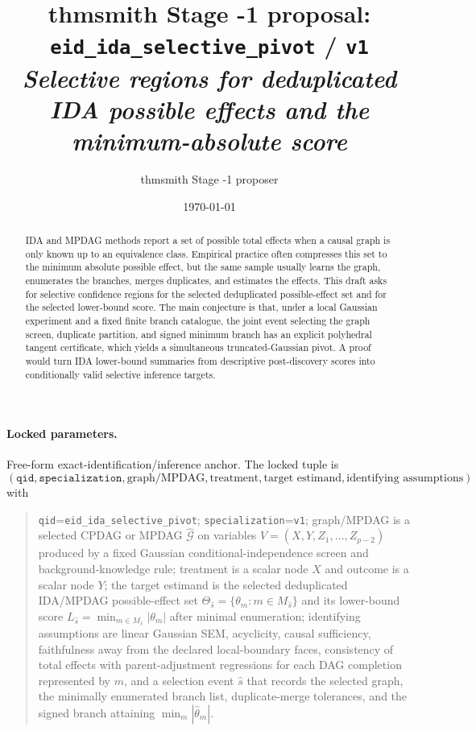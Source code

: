 \documentclass[11pt]{article}
\title{thmsmith Stage -1 proposal: \texttt{eid\_ida\_selective\_pivot} / \texttt{v1}%
  \\ \large\textit{Selective regions for deduplicated IDA possible effects and the minimum-absolute score}}
\author{thmsmith Stage -1 proposer}
\date{\today}
\theoremstyle{definition}
\theoremstyle{plain}
\theoremstyle{remark}
\begin{document}
\maketitle


\paragraph{Locked parameters.}
Free-form exact-identification/inference anchor. The locked tuple is
\[
(\texttt{qid},\texttt{specialization},\text{graph/MPDAG},\text{treatment},\text{target estimand},\text{identifying assumptions})
\]
with
\begin{quote}
\texttt{qid}=\texttt{eid\_ida\_selective\_pivot}; \texttt{specialization}=\texttt{v1}; graph/MPDAG is a selected CPDAG or MPDAG $\widehat{\mathcal G}$ on variables $V=(X,Y,Z_1,\ldots,Z_{p-2})$ produced by a fixed Gaussian conditional-independence screen and background-knowledge rule; treatment is a scalar node $X$ and outcome is a scalar node $Y$; the target estimand is the selected deduplicated IDA/MPDAG possible-effect set $\Theta_{\widehat s}=\{\theta_m:m\in M_{\widehat s}\}$ and its lower-bound score $L_{\widehat s}=\min_{m\in M_{\widehat s}}|\theta_m|$ after minimal enumeration; identifying assumptions are linear Gaussian SEM, acyclicity, causal sufficiency, faithfulness away from the declared local-boundary faces, consistency of total effects with parent-adjustment regressions for each DAG completion represented by $m$, and a selection event $\widehat s$ that records the selected graph, the minimally enumerated branch list, duplicate-merge tolerances, and the signed branch attaining $\min_m|\widehat\theta_m|$.
\end{quote}

\begin{abstract}
IDA and MPDAG methods report a set of possible total effects when a causal graph is only known up to an equivalence class. Empirical practice often compresses this set to the minimum absolute possible effect, but the same sample usually learns the graph, enumerates the branches, merges duplicates, and estimates the effects. This draft asks for selective confidence regions for the selected deduplicated possible-effect set and for the selected lower-bound score. The main conjecture is that, under a local Gaussian experiment and a fixed finite branch catalogue, the joint event selecting the graph screen, duplicate partition, and signed minimum branch has an explicit polyhedral tangent certificate, which yields a simultaneous truncated-Gaussian pivot. A proof would turn IDA lower-bound summaries from descriptive post-discovery scores into conditionally valid selective inference targets.
\end{abstract}
\end{document}

